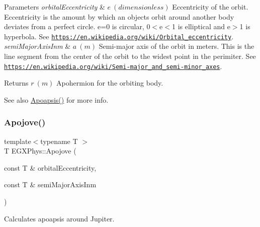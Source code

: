 \begin{DoxyParams}{Parameters}
{\em orbital\+Eccentricity} & $ e\ (dimensionless)$ Eccentricity of the orbit. Eccentricity is the amount by which an objects orbit around another body deviates from a perfect circle. e=0 is circular, 0$<$e$<$1 is elliptical and e$>$1 is hyperbola. See \href{https://en.wikipedia.org/wiki/Orbital_eccentricity}{\tt https\+://en.\+wikipedia.\+org/wiki/\+Orbital\+\_\+eccentricity}. \\
\hline
{\em semi\+Major\+Axis\+Inm} & $ a\ (m)$ Semi-\/major axis of the orbit in meters. This is the line segment from the center of the orbit to the widest point in the perimiter. See \href{https://en.wikipedia.org/wiki/Semi-major_and_semi-minor_axes}{\tt https\+://en.\+wikipedia.\+org/wiki/\+Semi-\/major\+\_\+and\+\_\+semi-\/minor\+\_\+axes}. \\
\hline
\end{DoxyParams}
\begin{DoxyReturn}{Returns}
$ r\ (m)$ Apohermion for the orbiting body. 
\end{DoxyReturn}
\begin{DoxySeeAlso}{See also}
\mbox{\hyperlink{group___e_g_x_phys-_apoapsis_gafd08a2d1d64886e7bb9bcb7ff65bc3ea}{Apoapsis()}} for more info. 
\end{DoxySeeAlso}
\mbox{\label{group___e_g_x_phys-_apoapsis_gad2a2021d43526fc752fe87beff789b28}} 
\subsubsection{\texorpdfstring{Apojove()}{Apojove()}}
{\footnotesize\ttfamily template$<$typename T $>$ \\
T E\+G\+X\+Phys\+::\+Apojove (\begin{DoxyParamCaption}\item[{const T \&}]{orbital\+Eccentricity,  }\item[{const T \&}]{semi\+Major\+Axis\+Inm }\end{DoxyParamCaption})}



Calculates apoapsis around Jupiter. 


